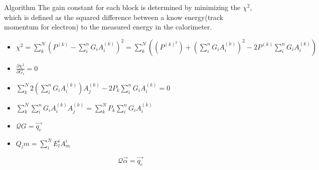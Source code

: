 \documentclass[aspectratio=169,xcolor=dvipsnames]{beamer}
\begin{document}
\begin{frame}{Algorithm}
The gain constant for each block is determined by minimizing the $\chi^2$, which is defined as the squared difference between a know energy(track momentum for electron) to the measured energy in the calorimeter. 
\begin{itemize}
    \item $\chi^2=\sum_k^N(P^{(k)}-\sum_i^nG_iA_i^{(k)})^2=\sum_k^N((P^{(k)}^2)+(\sum_i^nG_iA_i^{(k)})^2-2P^{(k)}\sum_i^nG_iA_i^{(k)})$
     \item $\frac{\partial\chi^2}{\partial G_i}=0$
     \item $\sum_k^N2(\sum_i^nG_iA_i^{(k)})A_j^{(k)}-2P_k\sum_i^nG_iA_i^{(k)}=0$
     \item $\sum_k^N\sum_i^nG_iA_i^{(k)}A_j^{(k)}=\sum_k^NP_k\sum_i^nG_iA_i^{(k)}$
     \item $\mathcal{Q}G=\vec{q_e}$
     \item $Q_lm = \sum_i^NE_l^iA_m^i$
\end{itemize}
\begin{equation}
        \mathcal{Q}\vec{\alpha}=\vec{q_e}
\end{equation}{}

\end{frame}
\end{document}
